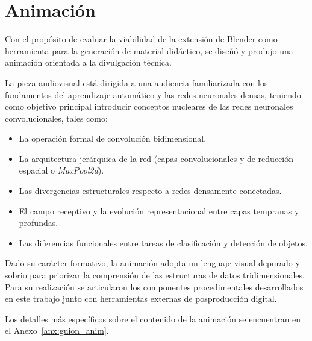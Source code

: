 \section{Animación}
Con el propósito de evaluar la viabilidad de la extensión de Blender como herramienta para la generación 
de material didáctico, se diseñó y produjo una animación orientada a la divulgación técnica.
\medskip

La pieza audiovisual está dirigida a una audiencia familiarizada con los fundamentos
 del aprendizaje automático y las redes neuronales densas, teniendo como objetivo principal 
 introducir conceptos nucleares de las redes neuronales convolucionales, tales como:
\begin{itemize}
    \item La operación formal de convolución bidimensional.
    \item La arquitectura jerárquica de la red (capas convolucionales y de reducción espacial o \textit{MaxPool2d}).
    \item Las divergencias estructurales respecto a redes densamente conectadas.
    \item El campo receptivo y la evolución representacional entre capas tempranas y profundas.
    \item Las diferencias funcionales entre tareas de clasificación y detección de objetos.
\end{itemize}

Dado su carácter formativo, la animación adopta un lenguaje visual depurado y sobrio para priorizar la
comprensión de las estructuras de datos tridimensionales. Para su realización se articularon los componentes 
procedimentales desarrollados en este trabajo junto con herramientas externas de posproducción digital.
\medskip

Los detalles más específicos sobre el contenido de la animación se encuentran en el Anexo~\ref{anx:guion_anim}.
